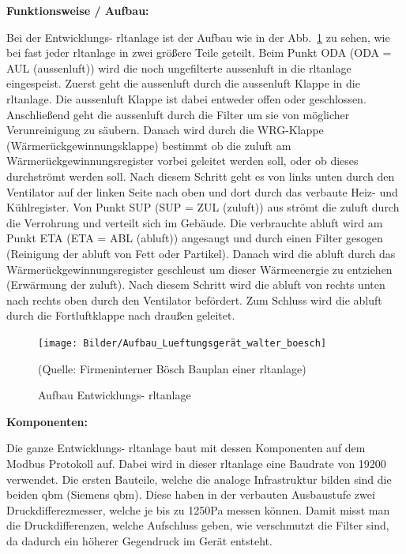 \textbf{Funktionsweise / Aufbau:}

Bei der Entwicklungs- \ac{rltanlage} ist der Aufbau wie in der Abb.~\ref{fig:Bauplan_entwicklung} zu sehen, wie bei fast jeder \ac{rltanlage} in zwei größere Teile geteilt.
Beim Punkt ODA (ODA = AUL (\gls{aussenluft})) wird die noch ungefilterte \gls{aussenluft} in die \ac{rltanlage} eingespeist. Zuerst geht die \gls{aussenluft} durch die \gls{aussenluft} Klappe in die \ac{rltanlage}. Die \gls{aussenluft} Klappe ist dabei entweder offen oder geschlossen. Anschließend geht die \gls{aussenluft} durch die Filter um sie von möglicher Verunreinigung zu säubern. Danach wird durch die WRG-Klappe (Wärmerückgewinnungsklappe) bestimmt ob die \gls{zuluft} am Wärmerückgewinnungsregister vorbei geleitet werden soll, oder ob dieses durchströmt werden soll. Nach diesem Schritt geht es von links unten durch den Ventilator auf der linken Seite nach oben und dort durch das verbaute Heiz- und Kühlregister. Von Punkt SUP (SUP = ZUL (\gls{zuluft})) aus strömt die \gls{zuluft} durch die Verrohrung und verteilt sich im Gebäude. Die verbrauchte \gls{abluft} wird am Punkt ETA (ETA = ABL (\gls{abluft})) angesaugt und durch einen Filter gesogen (Reinigung der \gls{abluft} von \zB Fett oder Partikel). Danach wird die \gls{abluft} durch das Wärmerückgewinnungsregister geschleust um dieser Wärmeenergie zu entziehen (Erwärmung der \gls{zuluft}). Nach diesem Schritt wird die \gls{abluft} von rechts unten nach rechts oben durch den Ventilator befördert. Zum Schluss wird die \gls{abluft} durch die Fortluftklappe nach draußen geleitet. 

\begin{figure}[H]
	\centering
	\texttt{[image: Bilder/Aufbau\_Lueftungsgerät\_walter\_boesch]}
	\caption{Aufbau Entwicklungs- \ac{rltanlage}} 
	(Quelle: Firmeninterner Bösch Bauplan einer \ac{rltanlage})
	\label{fig:Bauplan_entwicklung}
\end{figure}


\textbf{Komponenten:}

Die ganze Entwicklungs- \ac{rltanlage} baut mit dessen Komponenten auf dem Modbus Protokoll auf. Dabei wird in dieser \ac{rltanlage} eine Baudrate von 19200 verwendet. Die ersten Bauteile, welche die analoge Infrastruktur bilden sind die beiden \gls{qbm}  (Siemens \gls{qbm}). Diese haben in der verbauten Ausbaustufe zwei Druckdifferezmesser, welche je bis zu 1250Pa messen können. Damit misst man die Druckdifferenzen, welche Aufschluss geben, wie verschmutzt die Filter sind, da dadurch ein höherer Gegendruck im Gerät entsteht.

